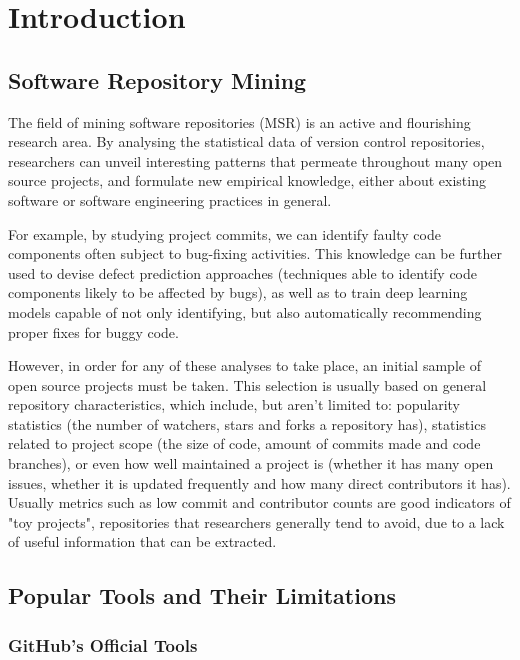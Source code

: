 \chapter{Introduction}

\section{Software Repository Mining}

The field of mining software repositories (MSR) is an active and flourishing research area.
By analysing the statistical data of version control repositories, researchers can unveil interesting patterns that permeate throughout many open source projects, and formulate new empirical knowledge, either about existing software or software engineering practices in general.

For example, by studying project commits, we can identify faulty code components often subject to bug-fixing activities.
This knowledge can be further used to devise defect prediction approaches (techniques able to identify code components likely to be affected by bugs), as well as to train deep learning models capable of not only identifying, but also automatically recommending proper fixes for buggy code.

However, in order for any of these analyses to take place, an initial sample of open source projects must be taken.
This selection is usually based on general repository characteristics, which include, but aren't limited to: popularity statistics (the number of watchers, stars and forks a repository has), statistics related to project scope (the size of code, amount of commits made and code branches), or even how well maintained a project is (whether it has many open issues, whether it is updated frequently and how many direct contributors it has).
Usually metrics such as low commit and contributor counts are good indicators of "toy projects", repositories that researchers generally tend to avoid, due to a lack of useful information that can be extracted.

\section{Popular Tools and Their Limitations}

\subsection{GitHub's Official Tools}

